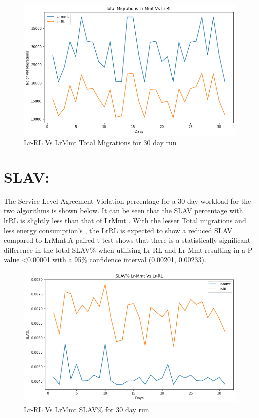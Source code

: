 \documentclass[a4paper,12pt]{Classes/RoboticsLaTeX}
\begin{document}
        \begin{figure}[H]
            \centering
            \includegraphics[width=1.0\linewidth]{Figures/Total_Migrations_30day.png}
            \caption{Lr-RL Vs LrMmt Total Migrations for 30 day run}
            \label{fig:enter-label}
        \end{figure}

        \section{SLAV:}

        The Service Level Agreement Violation percentage   for  a 30 day workload for the two algorithms is shown below. It can be seen that the SLAV percentage  with lrRL is slightly less than that of LrMmt . With the lesser Total  migrations and less energy consumption's , the LrRL is expected to show a reduced  SLAV  compared to LrMmt.A paired t-test shows that there is a statistically significant difference in the total SLAV\%  when utilising Lr-RL and Lr-Mmt resulting in a P-value <0.00001 with a 95\% confidence interval (0.00201, 0.00233).

        \begin{figure}[H]
            \centering
            \includegraphics[width=1.0\linewidth]{Figures/SLAV_30day.png}
            \caption{Lr-RL Vs LrMmt SLAV\% for 30 day run}
            \label{fig:enter-label}
        \end{figure}
\end{document}
